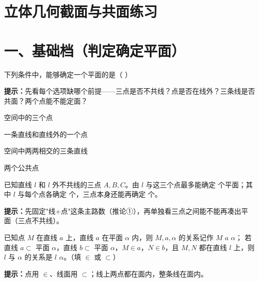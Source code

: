 \documentclass{exam-zh}
\begin{document}
\section*{立体几何截面与共面练习}

\section*{一、基础档（判定确定平面）}


\begin{question}[points=6]
  下列条件中，能够确定一个平面的是（    ）
  \begin{hintbox}
\textbf{提示：}先看每个选项缺哪个前提——三点是否不共线？点是否在线外？三条线是否共面？两个点能不能定面？\end{hintbox}

  \begin{choices}
    \item 空间中的三个点
    \item 一条直线和直线外的一个点
    \item 空间中两两相交的三条直线
    \item 两个公共点
  \end{choices}
\end{question}



\begin{question}[points=6]
  已知直线 $l$ 和 $l$ 外不共线的三点 $A,B,C$。由 $l$ 与这三个点最多能确定 \underline{\quad\quad} 个平面；其中 $l$ 与每个点各确定 \underline{\quad} 个，三点本身还能再确定 \underline{\quad} 个。
  \begin{hintbox}
\textbf{提示：}先固定"线+点"这条主路数（推论①），再单独看三点之间能不能再凑出平面（三点不共线）。\end{hintbox}

\end{question}



\begin{question}[points=6]
  已知点 $M$ 在直线 $a$ 上，直线 $a$ 在平面 $\alpha$ 内，则 $M,a,\alpha$ 的关系记作 $M$ \underline{\quad} $a$ \underline{\quad} $\alpha$；
若直线 $a\subset$ 平面 $\alpha$，直线 $b\subset$ 平面 $\alpha$，$M\in a$，$N\in b$，且 $M,N$ 都在直线 $l$ 上，则 $l$ 与 $\alpha$ 的关系是 $l$ \underline{\quad} $\alpha$。（填 $\in$ 或 $\subset$）
  \begin{hintbox}
\textbf{提示：}点用 $\in$、线面用 $\subset$；线上两点都在面内，整条线在面内。\end{hintbox}

\end{question}
\end{document}
